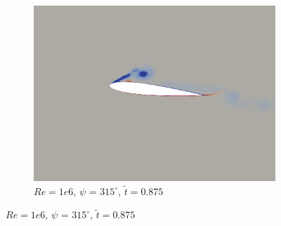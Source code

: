 \begin{figure}[H]
\begin{subfigure}[b]{0.32\textwidth}
		\includegraphics[width=1\textwidth]{figures/Vorticity_plots/Re_1m_1pt0/phase_315.png}
		\caption{$Re=1e6$, $\psi$ = $315^\circ$, $\tilde{t}=0.875$}
		\label{fig:Re_1m_1pt0_phi315}
	\end{subfigure}
	

\end{figure}
